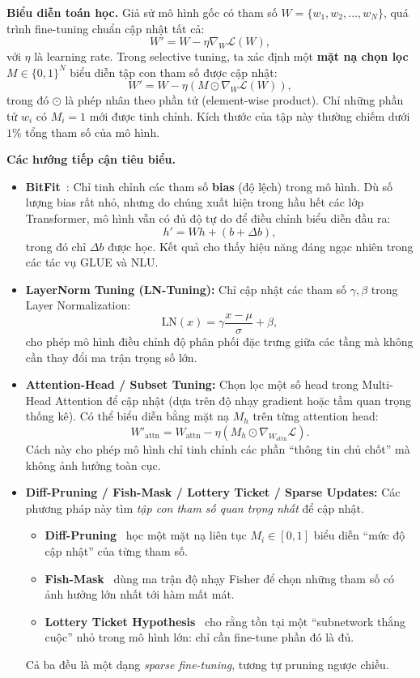 \textbf{Biểu diễn toán học.}  
Giả sử mô hình gốc có tham số $W = \{w_1, w_2, \dots, w_N\}$, quá trình fine-tuning chuẩn cập nhật tất cả:
\[
W' = W - \eta \nabla_W \mathcal{L}(W),
\]
với $\eta$ là learning rate.  
Trong selective tuning, ta xác định một \textbf{mặt nạ chọn lọc} $M \in \{0,1\}^N$ biểu diễn tập con tham số được cập nhật:
\[
W' = W - \eta (M \odot \nabla_W \mathcal{L}(W)),
\]
trong đó $\odot$ là phép nhân theo phần tử (element-wise product).  
Chỉ những phần tử $w_i$ có $M_i = 1$ mới được tinh chỉnh.  
Kích thước của tập này thường chiếm dưới $1\%$ tổng tham số của mô hình.

\textbf{Các hướng tiếp cận tiêu biểu.}
\begin{itemize}
	\item \textbf{BitFit}~\cite{zaken2021bitfit}:  
	Chỉ tinh chỉnh các tham số \textbf{bias} (độ lệch) trong mô hình.  
	Dù số lượng bias rất nhỏ, nhưng do chúng xuất hiện trong hầu hết các lớp Transformer, mô hình vẫn có đủ độ tự do để điều chỉnh biểu diễn đầu ra:
	\[
	h' = W h + (b + \Delta b),
	\]
	trong đó chỉ $\Delta b$ được học.  
	Kết quả cho thấy hiệu năng đáng ngạc nhiên trong các tác vụ GLUE và NLU.
	
	\item \textbf{LayerNorm Tuning (LN-Tuning):}
	Chỉ cập nhật các tham số $\gamma, \beta$ trong Layer Normalization:  
	\[
	\text{LN}(x) = \gamma \frac{x - \mu}{\sigma} + \beta,
	\]
	cho phép mô hình điều chỉnh độ phân phối đặc trưng giữa các tầng mà không cần thay đổi ma trận trọng số lớn.
	
	\item \textbf{Attention-Head / Subset Tuning\cite{ansell2022composable}:}  
	Chọn lọc một số head trong Multi-Head Attention để cập nhật (dựa trên độ nhạy gradient hoặc tầm quan trọng thống kê).  
	Có thể biểu diễn bằng mặt nạ $M_h$ trên từng attention head:
	\[
	W'_{\text{attn}} = W_{\text{attn}} - \eta (M_h \odot \nabla_{W_{\text{attn}}} \mathcal{L}).
	\]
	Cách này cho phép mô hình chỉ tinh chỉnh các phần “thông tin chủ chốt” mà không ảnh hưởng toàn cục.
	
	\item \textbf{Diff-Pruning / Fish-Mask / Lottery Ticket / Sparse Updates:}  
	Các phương pháp này tìm \emph{tập con tham số quan trọng nhất} để cập nhật.
	\begin{itemize}
		\item \textbf{Diff-Pruning}~\cite{guo2021parameter} học một mặt nạ liên tục $M_i \in [0,1]$ biểu diễn “mức độ cập nhật” của từng tham số.
		\item \textbf{Fish-Mask}~\cite{sung2022fishmask} dùng ma trận độ nhạy Fisher để chọn những tham số có ảnh hưởng lớn nhất tới hàm mất mát.
		\item \textbf{Lottery Ticket Hypothesis}~\cite{frankle2019lottery} cho rằng tồn tại một “subnetwork thắng cuộc” nhỏ trong mô hình lớn: chỉ cần fine-tune phần đó là đủ.
	\end{itemize}
	Cả ba đều là một dạng \textit{sparse fine-tuning}, tương tự pruning ngược chiều.
\end{itemize}

